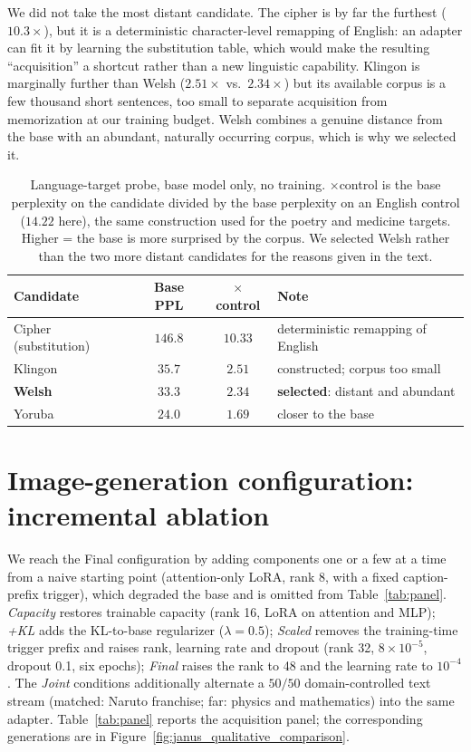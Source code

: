 We did not take the most distant candidate. The cipher is by far the furthest
($10.3\times$), but it is a deterministic character-level remapping of English:
an adapter can fit it by learning the substitution table, which would make the
resulting ``acquisition'' a shortcut rather than a new linguistic capability.
Klingon is marginally further than Welsh ($2.51\times$ vs.\ $2.34\times$) but its
available corpus is a few thousand short sentences, too small to separate
acquisition from memorization at our training budget. Welsh combines a genuine
distance from the base with an abundant, naturally occurring corpus, which is why
we selected it.

\begin{table}[h]\centering\small
\setlength{\tabcolsep}{8pt}
\begin{tabular}{lccl}
\toprule
Candidate & Base PPL & $\times$control & Note \\
\midrule
Cipher (substitution) & $146.8$ & $10.33$ & deterministic remapping of English \\
Klingon               & $35.7$  & $2.51$  & constructed; corpus too small \\
\textbf{Welsh}        & $33.3$  & $\mathbf{2.34}$ & \textbf{selected}: distant and abundant \\
Yoruba                & $24.0$  & $1.69$  & closer to the base \\
\bottomrule
\end{tabular}
\caption{Language-target probe, base model only, no training. $\times$control is
the base perplexity on the candidate divided by the base perplexity on an English
control ($14.22$ here), the same construction used for the poetry and medicine
targets. Higher = the base is more surprised by the corpus. We selected Welsh
rather than the two more distant candidates for the reasons given in the text.}
\label{tab:langprobe}
\end{table}


\section{Image-generation configuration: incremental ablation}
\label{app:ablation}
We reach the Final configuration by adding components one or a few at a time from
a naive starting point (attention-only LoRA, rank 8, with a fixed caption-prefix
trigger), which degraded the base and is omitted from Table~\ref{tab:panel}.
\textit{Capacity} restores trainable capacity (rank 16, LoRA on attention and
MLP); \textit{+KL} adds the KL-to-base regularizer ($\lambda{=}0.5$);
\textit{Scaled} removes the training-time trigger prefix and raises rank, learning
rate and dropout (rank 32, $8\times10^{-5}$, dropout 0.1, six epochs);
\textit{Final} raises the rank to 48 and the learning rate to $10^{-4}$. The
\textit{Joint} conditions additionally alternate a $50/50$ domain-controlled text
stream (matched: Naruto franchise; far: physics and mathematics) into the same
adapter. Table~\ref{tab:panel} reports the acquisition panel; the corresponding
generations are in Figure~\ref{fig:janus_qualitative_comparison}.

